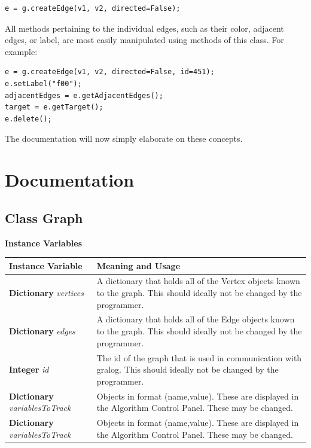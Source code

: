 \documentclass{article}
\newcounter{example}
\newlength\q
\begin{document}
\begin{lstlisting}
e = g.createEdge(v1, v2, directed=False);
\end{lstlisting}

All methods pertaining to the individual edges, such as their color, adjacent edges, or label, are most easily manipulated using methods of this class. For example:

\begin{lstlisting}
e = g.createEdge(v1, v2, directed=False, id=451);
e.setLabel("f00");
adjacentEdges = e.getAdjacentEdges();
target = e.getTarget();
e.delete();
\end{lstlisting}

The documentation will now simply elaborate on these concepts.

\section{Documentation}

\subsection{Class Graph}

\textbf{{\large Instance Variables}}


\begin{longtable}{p{\q}p{\q}}
Instance Variable & Meaning and Usage \\ \hline
\textbf{Dictionary} \textit{vertices} & A dictionary that holds all of the Vertex objects known to the graph. This should ideally not be changed by the programmer. \\\hline
\textbf{Dictionary} \textit{edges} & A dictionary that holds all of the Edge objects known to the graph. This should ideally not be changed by the programmer. \\\hline
\textbf{Integer} \textit{id} & The id of the graph that is used in communication with gralog. This should ideally not be changed by the programmer. \\ \hline
\textbf{Dictionary} \textit{variablesToTrack} & Objects in format (name,value). These are displayed in the Algorithm Control Panel. These may be changed. \\ \hline
\textbf{Dictionary} \textit{variablesToTrack} & Objects in format (name,value). These are displayed in the Algorithm Control Panel. These may be changed. \\ \hline
\end{longtable}
\end{document}
